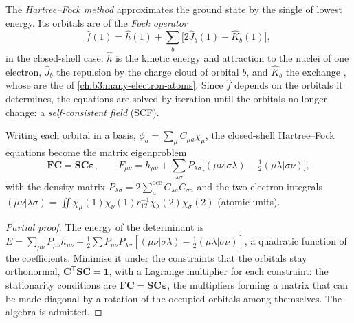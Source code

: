 \begin{definition}\label{def:b3:computational-chemistry:hartree-fock}
The \emph{Hartree--Fock method} approximates the
ground state by the single  of lowest energy. Its orbitals
are  of the \emph{Fock operator}
\[
\hat f(1) = \hat h(1) + \sum_b\big[2\hat J_b(1) - \hat K_b(1)\big],
\]
in the closed-shell case: $\hat h$ is the kinetic energy and attraction to the
nuclei of one electron, $\hat J_b$ the repulsion by the charge cloud of
orbital $b$, and $\hat K_b$ the exchange , whose  are
the  of \cref{ch:b3:many-electron-atoms}. Since $\hat f$
depends on the orbitals it determines, the equations are solved by
iteration until the orbitals no longer change: a \emph{self-consistent
field} (SCF).
\end{definition}

\begin{theorem}\label{thm:b3:computational-chemistry:roothaan}
Writing each orbital in a basis, $\phi_a = \sum_\mu C_{\mu a}\chi_\mu$, the
closed-shell Hartree--Fock equations become the matrix eigenproblem
\[
\mathbf F\mathbf C = \mathbf S\mathbf C\boldsymbol\varepsilon, \qquad F_{\mu\nu} =
h_{\mu\nu} + \sum_{\lambda\sigma}P_{\lambda\sigma}\big[(\mu\nu|\sigma\lambda) -
\tfrac12(\mu\lambda|\sigma\nu)\big],
\]
with the density matrix $P_{\lambda\sigma} = 2\sum_a^{\mathrm{occ}}C_{\lambda a}C_{\sigma
a}$ and the two-electron integrals $(\mu\nu|\lambda\sigma) = \iint\chi_\mu(1)\chi_\nu(1)
r_{12}^{-1}\chi_\lambda(2)\chi_\sigma(2)$ (atomic units).
\end{theorem}

\begin{proof}[Partial proof]
The energy of the determinant is $E = \sum_{\mu\nu}P_{\mu\nu}h_{\mu\nu} + \frac12
\sum P_{\mu\nu}P_{\lambda\sigma}[(\mu\nu|\sigma\lambda) - \frac12(\mu\lambda|\sigma\nu)]$, a
quadratic function of the coefficients. Minimise it under the constraints
that the orbitals stay orthonormal, $\mathbf C^{\mathsf T}\mathbf S\mathbf C = \mathbf 1$,
with a Lagrange multiplier for each constraint: the stationarity
conditions are $\mathbf F\mathbf C = \mathbf S\mathbf C\boldsymbol\varepsilon$, the
multipliers forming a matrix that can be made diagonal by a rotation of the
occupied orbitals among themselves. The algebra is admitted.
\end{proof}

